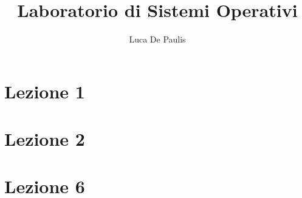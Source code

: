 \documentclass[
    oneside,
    10pt,
    pagestyle=notes,
    fontstyle=palaeuler,
    thmstyle=boxedthm,
]{modernth}
\begin{document}
\author{Luca De Paulis}
\title{Laboratorio di Sistemi Operativi}
\maketitle

\frontmatter{}
\tableofcontents

\mainmatter{}

\chapter{Lezione 1}


\chapter{Lezione 2}





\chapter{Lezione 6}





\end{document}
